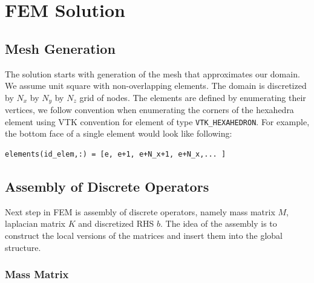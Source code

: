 \documentclass[unicode,11pt,a4paper,oneside,numbers=endperiod,openany]{scrartcl}
\begin{document}
\section{FEM Solution}

\subsection{Mesh Generation}

The solution starts with generation of the mesh that approximates our domain. We assume unit square with non-overlapping elements. The domain is discretized by $N_x$ by $N_y$ by $N_z$ grid of nodes. The elements are defined by enumerating their vertices, we follow convention when enumerating the corners of the hexahedra element using VTK convention for element of type \texttt{VTK\_HEXAHEDRON}. For example, the bottom face of a single element would look like following:


\begin{lstlisting}
elements(id_elem,:) = [e, e+1, e+N_x+1, e+N_x,... ]
\end{lstlisting}

\subsection{Assembly of Discrete Operators}

Next step in FEM is assembly of discrete operators, namely mass matrix $M$, laplacian matrix $K$ and discretized RHS $b$. The idea of the assembly is to construct the local versions of the matrices and insert them into the global structure. 

\subsubsection{Mass Matrix}
\end{document}

